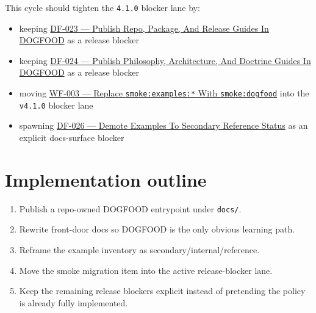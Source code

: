 This cycle should tighten the \texttt{4\allowbreak{}.\allowbreak{}1\allowbreak{}.\allowbreak{}0} blocker lane by:

\begin{itemize}
\tightlist
\item
  keeping \href{https://github.com/flyingrobots/bijou/blob/cbd70612140e7a450d764b3c7be1c6af878b99bc/docs/design/DF-023-publish-repo-package-and-release-guides-in-dogfood.md}{DF-023 --- Publish Repo, Package, And Release Guides In DOGFOOD} as a release blocker
\item
  keeping \href{https://github.com/flyingrobots/bijou/blob/cbd70612140e7a450d764b3c7be1c6af878b99bc/docs/design/DF-024-publish-philosophy-architecture-and-doctrine-guides-in-dogfood.md}{DF-024 --- Publish Philosophy, Architecture, And Doctrine Guides In DOGFOOD} as a release blocker
\item
  moving \href{https://github.com/flyingrobots/bijou/blob/cbd70612140e7a450d764b3c7be1c6af878b99bc/docs/design/WF-003-replace-smoke-examples-with-smoke-dogfood.md}{WF-003 --- Replace \texttt{s\allowbreak{}m\allowbreak{}o\allowbreak{}k\allowbreak{}e\allowbreak{}:\allowbreak{}e\allowbreak{}x\allowbreak{}a\allowbreak{}m\allowbreak{}p\allowbreak{}l\allowbreak{}e\allowbreak{}s\allowbreak{}:\allowbreak{}*} With \texttt{s\allowbreak{}m\allowbreak{}o\allowbreak{}k\allowbreak{}e\allowbreak{}:\allowbreak{}d\allowbreak{}o\allowbreak{}g\allowbreak{}f\allowbreak{}o\allowbreak{}o\allowbreak{}d}} into the \texttt{v\allowbreak{}4\allowbreak{}.\allowbreak{}1\allowbreak{}.\allowbreak{}0} blocker lane
\item
  spawning \href{https://github.com/flyingrobots/bijou/blob/cbd70612140e7a450d764b3c7be1c6af878b99bc/docs/design/DF-026-demote-examples-to-secondary-reference-status.md}{DF-026 --- Demote Examples To Secondary Reference Status} as an explicit docs-surface blocker
\end{itemize}

\section{Implementation outline}\label{record-086-implementation-outline}

\begin{enumerate}
\def\labelenumi{\arabic{enumi}.}
\tightlist
\item
  Publish a repo-owned DOGFOOD entrypoint under \texttt{d\allowbreak{}o\allowbreak{}c\allowbreak{}s\allowbreak{}/}.
\item
  Rewrite front-door docs so DOGFOOD is the only obvious learning path.
\item
  Reframe the example inventory as secondary/internal/reference.
\item
  Move the smoke migration item into the active release-blocker lane.
\item
  Keep the remaining release blockers explicit instead of pretending the policy is already fully implemented.
\end{enumerate}

